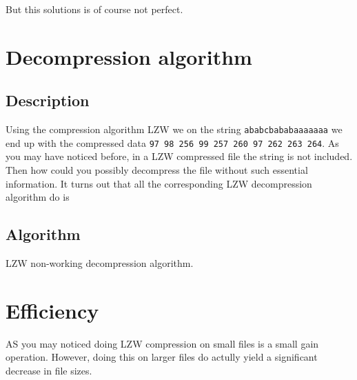 \begin{refsection}
But this solutions is of course not perfect.

\section{Decompression algorithm}

\subsection{Description}

Using the compression algorithm LZW we on the string
\texttt{ababcbababaaaaaaa} we end up with the compressed data
\texttt{97 98 256 99 257 260 97 262 263 264}. As you may have noticed
before, in a LZW compressed file the string is not included. Then how
could you possibly decompress the file without such essential
information. It turns out that all the corresponding LZW decompression
algorithm do is

\subsection{Algorithm}

\begin{algorithm}[H]
  \caption{LZW non-working decompression algorithm.}
  \label{alg:lzw-non-working-decompression}
  \begin{algorithmic}[1]
    \State {}
    \While{\neof}


      \State {}

      \State {}

    \EndWhile
  \end{algorithmic}
\end{algorithm}

\section{Efficiency}

AS you may noticed doing LZW compression on small files is a small
gain operation. However, doing this on larger files do actully yield a
significant decrease in file sizes.

\FloatBarrier

\printbibliography[heading=subbibliography]

\end{refsection}
